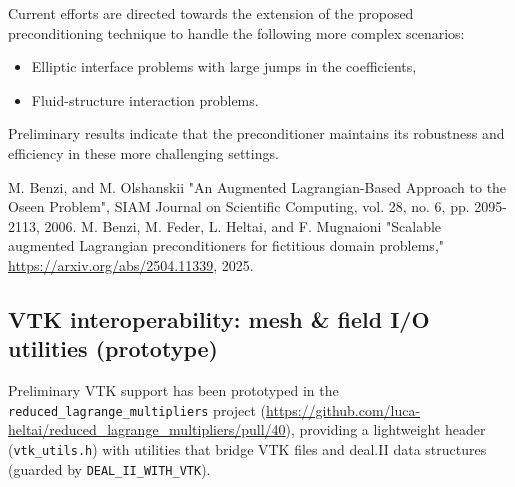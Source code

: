 \documentclass[a4paper,12pt]{article}
\begin{document}
\begin{center}
      \begin{minipage}{\linewidth}
            \centering
            \label{tab:stokes_3D_torus}
      \end{minipage}
\end{center}


Current efforts are directed towards the extension of the proposed preconditioning technique
to handle the following more complex scenarios:
\begin{itemize}
    \item Elliptic interface problems with large jumps in the coefficients,
    \item Fluid-structure interaction problems.
\end{itemize}
Preliminary results indicate that the preconditioner maintains its robustness and efficiency in these more
challenging settings.

\begin{thebibliography}{10}
     M. Benzi, and M. Olshanskii "An Augmented Lagrangian-Based Approach to the Oseen Problem", SIAM Journal on Scientific
Computing, vol. 28, no. 6, pp. 2095-2113, 2006.
     M. Benzi, M. Feder, L. Heltai, and F. Mugnaioni "Scalable augmented Lagrangian preconditioners for fictitious domain problems," \url{https://arxiv.org/abs/2504.11339}, 2025.
\end{thebibliography}


\subsection{VTK interoperability: mesh \& field I/O utilities (prototype)}
Preliminary VTK support has been prototyped in the \texttt{reduced\_lagrange\_multipliers}
project (\url{https://github.com/luca-heltai/reduced_lagrange_multipliers/pull/40}),
providing a lightweight header (\texttt{vtk\_utils.h}) with utilities that bridge
VTK files and deal.II data structures (guarded by \texttt{DEAL\_II\_WITH\_VTK}).
\end{document}
